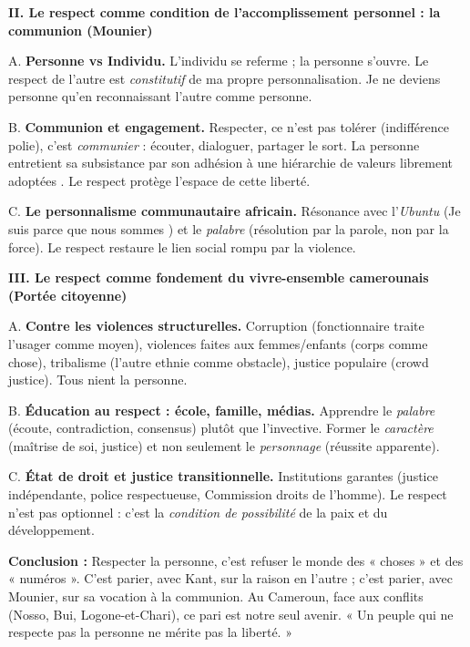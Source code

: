 \documentclass[11pt]{article}
\begin{document}
\begin{corrige}
\textbf{II. Le respect comme condition de l'accomplissement personnel : la communion (Mounier)}
\par A. \textbf{Personne vs Individu.} L'individu se referme ; la personne s'ouvre. Le respect de l'autre est \emph{constitutif} de ma propre personnalisation. Je ne deviens personne qu'en reconnaissant l'autre comme personne.
\par B. \textbf{Communion et engagement.} Respecter, ce n'est pas tolérer (indifférence polie), c'est \emph{communier} : écouter, dialoguer, partager le sort. \guillemotleft La personne entretient sa subsistance par son adhésion à une hiérarchie de valeurs librement adoptées \guillemotright. Le respect protège l'espace de cette liberté.
\par C. \textbf{Le personnalisme communautaire africain.} Résonance avec l'\emph{Ubuntu} (\guillemotleft Je suis parce que nous sommes \guillemotright) et le \emph{palabre} (résolution par la parole, non par la force). Le respect restaure le lien social rompu par la violence.

\textbf{III. Le respect comme fondement du vivre-ensemble camerounais (Portée citoyenne)}
\par A. \textbf{Contre les violences structurelles.} Corruption (fonctionnaire traite l'usager comme moyen), violences faites aux femmes/enfants (corps comme chose), tribalisme (l'autre ethnie comme obstacle), justice populaire (crowd justice). Tous nient la personne.
\par B. \textbf{Éducation au respect : école, famille, médias.} Apprendre le \emph{palabre} (écoute, contradiction, consensus) plutôt que l'invective. Former le \emph{caractère} (maîtrise de soi, justice) et non seulement le \emph{personnage} (réussite apparente).
\par C. \textbf{État de droit et justice transitionnelle.} Institutions garantes (justice indépendante, police respectueuse, Commission droits de l'homme). Le respect n'est pas optionnel : c'est la \emph{condition de possibilité} de la paix et du développement.

\textbf{Conclusion :} Respecter la personne, c'est refuser le monde des « choses » et des « numéros ». C'est parier, avec Kant, sur la raison en l'autre ; c'est parier, avec Mounier, sur sa vocation à la communion. Au Cameroun, face aux conflits (Nosso, Bui, Logone-et-Chari), ce pari est notre seul avenir. « Un peuple qui ne respecte pas la personne ne mérite pas la liberté. »


\end{corrige}
\end{document}

